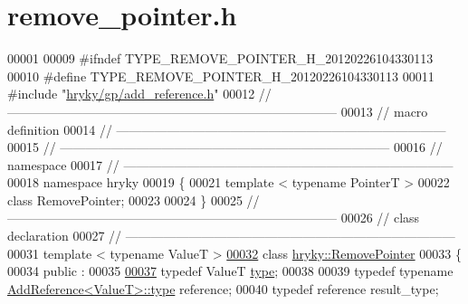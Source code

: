 \hypertarget{remove__pointer_8h_source}{\section{remove\-\_\-pointer.\-h}
}

\begin{DoxyCode}
00001 
00009 \textcolor{preprocessor}{#ifndef TYPE\_REMOVE\_POINTER\_H\_20120226104330113}
00010 \textcolor{preprocessor}{}\textcolor{preprocessor}{#define TYPE\_REMOVE\_POINTER\_H\_20120226104330113}
00011 \textcolor{preprocessor}{}\textcolor{preprocessor}{#include "\hyperlink{add__reference_8h}{hryky/gp/add_reference.h}"}
00012 \textcolor{comment}{//
      ------------------------------------------------------------------------------}
00013 \textcolor{comment}{// macro definition}
00014 \textcolor{comment}{//
      ------------------------------------------------------------------------------}
00015 \textcolor{comment}{//
      ------------------------------------------------------------------------------}
00016 \textcolor{comment}{// namespace}
00017 \textcolor{comment}{//
      ------------------------------------------------------------------------------}
00018 \textcolor{keyword}{namespace }hryky
00019 \{
00021     \textcolor{keyword}{template} < \textcolor{keyword}{typename} Po\textcolor{keywordtype}{int}erT >
00022     \textcolor{keyword}{class }RemovePointer;
00023     
00024 \}
00025 \textcolor{comment}{//
      ------------------------------------------------------------------------------}
00026 \textcolor{comment}{// class declaration}
00027 \textcolor{comment}{//
      ------------------------------------------------------------------------------}
00031 \textcolor{comment}{}\textcolor{keyword}{template} < \textcolor{keyword}{typename} ValueT >
\hypertarget{remove__pointer_8h_source_l00032}{}\hyperlink{classhryky_1_1_remove_pointer}{00032} \textcolor{keyword}{class }\hyperlink{classhryky_1_1_remove_pointer}{hryky::RemovePointer}
00033 \{
00034 \textcolor{keyword}{public} :
00035 
\hypertarget{remove__pointer_8h_source_l00037}{}\hyperlink{classhryky_1_1_remove_pointer_a7137db713acb2cd6b5a368ee5cca3842}{00037}     \textcolor{keyword}{typedef} ValueT                                  \hyperlink{classhryky_1_1_remove_pointer_a7137db713acb2cd6b5a368ee5cca3842}{type};
00038     
00039     \textcolor{keyword}{typedef} \textcolor{keyword}{typename} \hyperlink{classhryky_1_1_add_reference_a4b90c1381625432ba6152b7388bc4399}{AddReference<ValueT>::type}     reference;
00040     \textcolor{keyword}{typedef} reference                               result\_type;

\end{DoxyCode}
